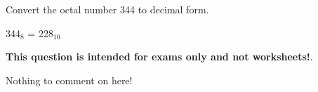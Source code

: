 

Convert the octal number 344 to decimal form.







344$_8$ = 228$_{10}$







{\bf This question is intended for exams only and not worksheets!}.

Nothing to comment on here!




